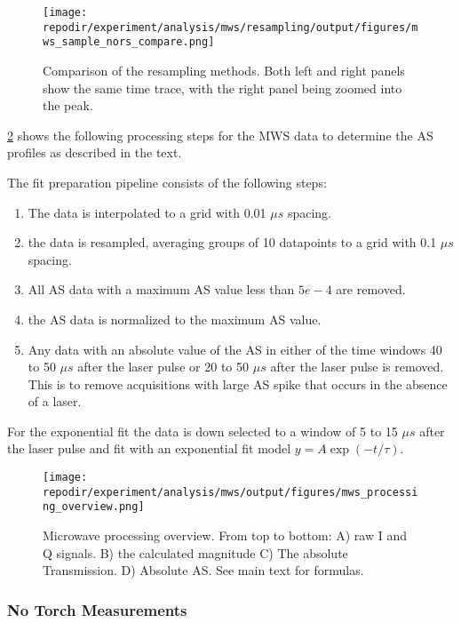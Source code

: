 \begin{figure}
\centering
\texttt{[image: \\repodir/experiment/analysis/mws/resampling/output/figures/mws\_sample\_nors\_compare.png]}
\caption{Comparison of the resampling methods. Both left and right panels show the same time trace, with the right panel being zoomed into the peak.}
\label{fig:SI_mws_resampling}
\end{figure}

\ref{fig:SI_mws_processing_overview} shows the following processing steps for the MWS data to determine the AS profiles as described in the text.

The fit preparation pipeline consists of the following steps:

\begin{enumerate}
    \item The data is interpolated to a grid with 0.01 $\mu s$ spacing.
    \item the data is resampled, averaging groups of 10 datapoints to a grid with 0.1 $\mu s$ spacing.
    \item  All AS data with a maximum AS value less than $5e-4$ are removed.
    \item the AS data is normalized to the maximum AS value.
    \item Any data with an absolute value of the AS in either of the time windows 40 to 50 $\mu s$ after the laser pulse or 20 to 50 $\mu s$ after the laser pulse is removed. This is to remove acquisitions with large AS spike that occurs in the absence of a laser. 
\end{enumerate}


For the exponential fit the data is down selected to a window of 5 to 15 $\mu s$ after the laser pulse and fit with an exponential fit model $y = A \exp(-t/\tau) $.


\begin{figure}[]
\centering
\texttt{[image: \\repodir/experiment/analysis/mws/output/figures/mws\_processing\_overview.png]}
\caption{Microwave processing overview. From top to bottom: A) raw I and Q signals. B) the calculated magnitude C) The absolute Transmission. D) Absolute AS. See main text for formulas.  }
\label{fig:SI_mws_processing_overview}
\end{figure}


\subsubsection{No Torch Measurements}


